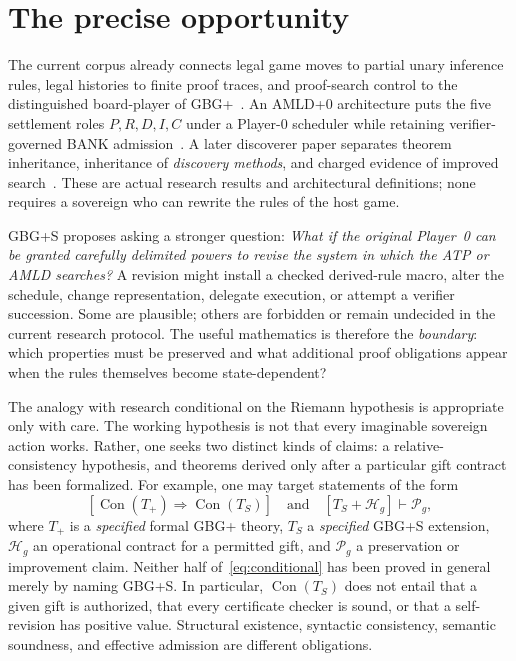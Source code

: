 \documentclass[11pt,letterpaper]{article}
\theoremstyle{remark}
\newcommand{\Con}{\operatorname{Con}}
\begin{document}
\section{The precise opportunity}
The current corpus already connects legal game moves to partial unary inference rules, legal histories to finite proof traces, and proof-search control to the distinguished board-player of GBG+~\cite{GBG,GBGp}. An AMLD+0 architecture puts the five settlement roles $P,R,D,I,C$ under a Player-0 scheduler while retaining verifier-governed BANK admission~\cite{AMLD0}. A later discoverer paper separates theorem inheritance, inheritance of \emph{discovery methods}, and charged evidence of improved search~\cite{Successor}. These are actual research results and architectural definitions; none requires a sovereign who can rewrite the rules of the host game.

GBG+S proposes asking a stronger question: \emph{What if the original Player~0 can be granted carefully delimited powers to revise the system in which the ATP or AMLD searches?} A revision might install a checked derived-rule macro, alter the schedule, change representation, delegate execution, or attempt a verifier succession. Some are plausible; others are forbidden or remain undecided in the current research protocol. The useful mathematics is therefore the \emph{boundary}: which properties must be preserved and what additional proof obligations appear when the rules themselves become state-dependent?

The analogy with research conditional on the Riemann hypothesis is appropriate only with care. The working hypothesis is not that every imaginable sovereign action works. Rather, one seeks two distinct kinds of claims: a relative-consistency hypothesis, and theorems derived only after a particular gift contract has been formalized. For example, one may target statements of the form
\begin{equation}\label{eq:conditional}
\left[\Con(T_{+})\Rightarrow\Con(T_{S})\right]
\quad\text{and}\quad
\left[T_S+\mathcal H_g\right]\vdash\mathcal P_g,
\end{equation}
where $T_{+}$ is a \emph{specified} formal GBG+ theory, $T_S$ a \emph{specified} GBG+S extension, $\mathcal H_g$ an operational contract for a permitted gift, and $\mathcal P_g$ a preservation or improvement claim. Neither half of~\eqref{eq:conditional} has been proved in general merely by naming GBG+S. In particular, $\Con(T_S)$ does not entail that a given gift is authorized, that every certificate checker is sound, or that a self-revision has positive value. Structural existence, syntactic consistency, semantic soundness, and effective admission are different obligations.
\end{document}
